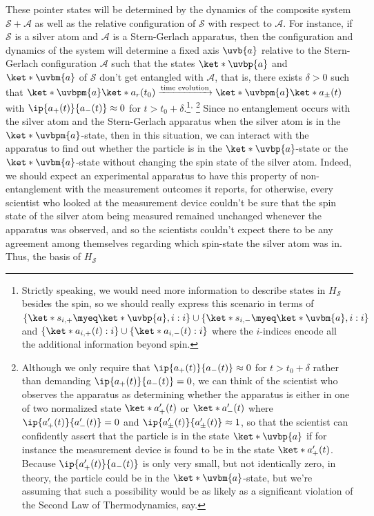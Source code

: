 \documentclass[12pt]{report}
\begin{document}
%
    These pointer states will be determined by the  dynamics of the composite system $\mathcal{S}+\mathcal{A}$ as well as the relative configuration of $\mathcal{S}$ with respect to $\mathcal{A}$. For instance, if $\mathcal{S}$ is a silver atom and $\mathcal{A}$ is a Stern-Gerlach apparatus, then the configuration and dynamics of the system will determine a fixed axis $\uvb{a}$ relative to the Stern-Gerlach configuration $\mathcal{A}$ such that the states $\ket*{\uvbp{a}}$ and $\ket*{\uvbm{a}}$ of $\mathcal{S}$ don't get entangled with $\mathcal{A}$, that is, there exists $\delta>0$ such that $\ket*{\uvbpm{a}}\ket*{a_r(t_0)}\xrightarrow{\text{time evolution}}\ket*{\uvbpm{a}}\ket*{a_\pm(t)}$ with $\ip{a_+(t)}{a_-(t)}\approx 0$ for $t> t_0+\delta$.\footnote{%
    Strictly speaking, we would  need more information to describe states in $H_\mathcal{S}$ besides the spin, so we should really express this scenario in terms of $\{\ket*{s_{i,+}}\myeq \ket*{\uvbp{a},i}:i\}\cup \{\ket*{s_{i,-}}\myeq \ket*{\uvbm{a},i}:i\}$ and  $\{\ket*{a_{i,+}(t)}:i\}\cup\{\ket*{a_{i,-}(t)}:i\}$ where the $i$-indices encode all the additional information beyond spin.
    }\textsuperscript{, }\footnote{\label{nearzero}Although 
    we only require that  $\ip{a_+(t)}{a_-(t)}\approx 0$ for $t> t_0+\delta$ rather than demanding $\ip{a_+(t)}{a_-(t)} = 0$, we can think of the scientist who observes the apparatus as determining whether the apparatus is either in one of two normalized state $\ket*{a_+'(t)}$ or $\ket*{a_-'(t)}$ where 
    $\ip{a_+'(t)}{a_-'(t)} = 0$ 
    and $\ip{a_\pm'(t)}{a_\pm'(t)}\approx 1$, so that the scientist can confidently assert that the particle is in the state $\ket*{\uvbp{a}}$ if for instance the measurement device is found to be in the state $\ket*{a_+'(t)}$. Because $\ip{a_+'(t)}{a_-(t)}$ is only very small, but not identically zero, in theory, the particle could be in the $\ket*{\uvbm{a}}$-state, but we're assuming that such a possibility would be as likely as a significant violation of the Second Law of Thermodynamics, say.}
    Since no entanglement occurs with the silver atom and the Stern-Gerlach apparatus when the silver atom is in the $\ket*{\uvbpm{a}}$-state, then in this situation, we can interact with the apparatus to find out whether the particle is in the $\ket*{\uvbp{a}}$-state or the $\ket*{\uvbm{a}}$-state without changing the spin state of the silver atom. Indeed, we should expect an experimental apparatus to have this property of non-entanglement with the measurement outcomes it reports, for otherwise, every scientist who looked at the measurement device couldn't be sure that the spin state of the silver atom being measured remained unchanged whenever the apparatus was observed, and so the scientists couldn't expect there to be any agreement among themselves  regarding which spin-state the silver atom was in. Thus, the basis of $H_\mathcal{S}$ 
\end{document}
